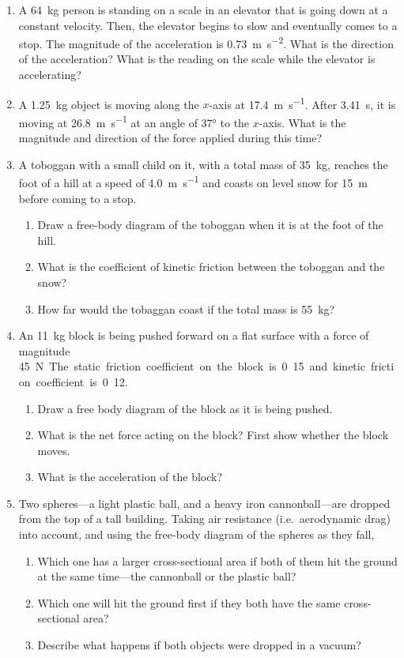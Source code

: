 \begin{enumerate}[itemsep=6pt]
\item A \SI{64}{\kilo\gram} person is standing on a scale in an elevator that
  is going down at a constant velocity. Then, the elevator begins to slow and
  eventually comes to a stop. The magnitude of the acceleration is
  \SI{.73}{\metre\per\second\squared}. What is the direction of the
  acceleration? What is the reading on the scale while the elevator is
  accelerating?
    
\item A \SI{1.25}{\kilo\gram} object is moving along the $x$-axis at
  \SI{17.4}{\metre\per\second}. After \SI{3.41}{\second}, it is moving at
  \SI{26.8}{\metre\per\second} at an angle of \ang{37} to the $x$-axis. What is
  the magnitude and direction of the force applied during this time?
  
\item A toboggan with a small child on it, with a total mass of
  \SI{35}{\kilo\gram}, reaches the foot of a hill at a speed of
  \SI{4.0}{\metre\per\second} and coasts on level snow for \SI{15}{\metre}
  before coming to a stop.
  \begin{enumerate}[itemsep=3pt]
  \item Draw a free-body diagram of the toboggan when it is at the foot of
    the hill.
  \item What is the coefficient of kinetic friction between the toboggan and
    the snow?
  \item How far would the tobaggan coast if the total mass is
    \SI{55}{\kilo\gram}?
  \end{enumerate}
    
\item An \SI{11}{\kilo\gram} block is being pushed forward on a flat surface
  with a force of magnitude \SI{45}\newton. The static friction coefficient on
  the block is 0.15 and kinetic friction coefficient is 0.12.
  \begin{enumerate}[itemsep=3pt]
  \item Draw a free body diagram of the block as it is being pushed.
  \item What is the net force acting on the block? First show whether the
    block moves.
  \item What is the acceleration of the block?
  \end{enumerate}
  
\item Two spheres---a light plastic ball, and a heavy iron cannonball---are
  dropped from the top of a tall building. Taking air resistance (i.e.\
  aerodynamic drag) into account, and using the free-body diagram of the
  spheres as they fall,
  \begin{enumerate}[itemsep=3pt]
  \item Which one has a larger cross-sectional area if both of them hit the
    ground at the same time---the cannonball or the plastic ball?
  \item Which one will hit the ground first if they both have the same
    cross-sectional area?
  \item Describe what happens if both objects were dropped in a vacuum?
  \end{enumerate}
  

\end{enumerate}
